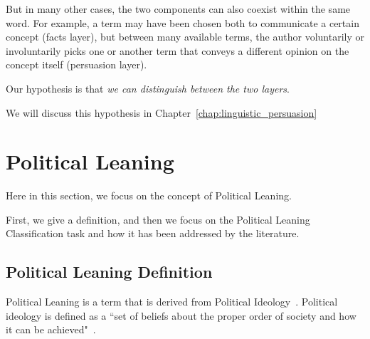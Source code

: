But in many other cases, the two components can also coexist within the same word. For example, a term may have been chosen both to communicate a certain concept (facts layer), but between many available terms, the author voluntarily or involuntarily picks one or another term that conveys a different opinion on the concept itself (persuasion layer).




Our hypothesis is that \emph{we can distinguish between the two layers}.

We will discuss this hypothesis in Chapter~\ref{chap:linguistic_persuasion}


\section{\statusred Political Leaning}
\label{sec:lit_leaning}


Here in this section, we focus on the concept of Political Leaning.

First, we give a definition, and then we focus on the Political Leaning Classification task and how it has been addressed by the literature.

\subsection{Political Leaning Definition}

Political Leaning is a term that is derived from Political Ideology~\citep{jost2009political}.
Political ideology is defined as a ``set of beliefs about the proper order of society and how it can be achieved"~\citep[p.~64]{erikson2015american}.

